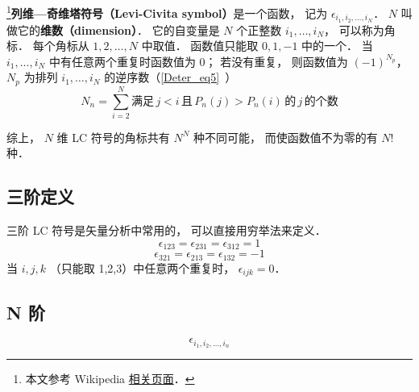 
\footnote{本文参考 Wikipedia \href{https://en.wikipedia.org/wiki/Levi-Civita_symbol}{相关页面}．}\textbf{列维—奇维塔符号（Levi-Civita symbol）}是一个函数， 记为 $\epsilon_{i_1, i_2, \dots, i_N}$． $N$ 叫做它的\textbf{维数（dimension）}． 它的自变量是 $N$ 个正整数 $i_1, \dots, i_N$， 可以称为角标． 每个角标从 $1, 2, \dots, N$ 中取值． 函数值只能取 $0, 1, -1$ 中的一个． 当 $i_1, \dots, i_N$ 中有任意两个重复时函数值为 0； 若没有重复， 则函数值为 $(-1)^{N_p}$， $N_p$ 为排列 $i_1, \dots, i_N$ 的逆序数（\autoref{Deter_eq5}~）
\begin{equation}
N_n = \sum_{i=2}^N \text{满足}\, j<i \,\text{且}\, P_n(j) > P_n(i) \, \text{的}\, j\, \text{的个数}
\end{equation}

综上， $N$ 维 LC 符号的角标共有 $N^N$ 种不同可能， 而使函数值不为零的有 $N!$ 种．

\subsection{三阶定义}
三阶 LC 符号是矢量分析中常用的， 可以直接用穷举法来定义．
\begin{equation}
\epsilon_{123} = \epsilon_{231} = \epsilon_{312} = 1
\end{equation}
\begin{equation}
\epsilon_{321} = \epsilon_{213} = \epsilon_{132} = -1
\end{equation}
当 $i,j,k$ （只能取 1,2,3）中任意两个重复时， $\epsilon_{ijk} = 0$．

\subsection{N 阶}
\begin{equation}
\epsilon_{i_1,i_2,\dots, i_n}
\end{equation}
